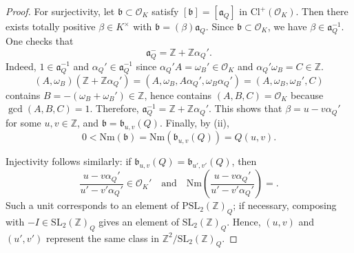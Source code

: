 \documentclass[10pt,a4paper]{amsart}
\begin{document}
\begin{proof}
For surjectivity, let $\mathfrak{b}\subset\mathcal{O}_{K}$ satisfy $[\mathfrak{b}]=[\mathfrak{a}_{Q}]$ in $\mathrm{Cl}^{+}(\mathcal{O}_{K})$.
Then there exists totally positive $\beta\in K^{\times}$ with $\mathfrak{b}=(\beta)\mathfrak{a}_{Q}$.
Since $\mathfrak{b}\subset\mathcal{O}_{K}$, we have $\beta\in\mathfrak{a}_{Q}^{-1}$.
One checks that
$$\mathfrak{a}_{Q}^{-}=\mathbb{Z}+\mathbb{Z}\alpha_{Q}'.$$
Indeed, $1\in\mathfrak{a}_{Q}^{-1}$ and $\alpha_{Q}'\in\mathfrak{a}_{Q}^{-1}$ since $\alpha_Q'A=\omega_{B}'\in\mathcal{O}_{K}$ and $\alpha_Q'\omega_B=C\in\mathbb{Z}$.
$$(A,\omega_{B})(\mathbb{Z}+\mathbb{Z}\alpha_{Q}')=(A,\omega_{B},A\alpha_{Q}',\omega_{B}\alpha_{Q}')=(A,\omega_{B},\omega_{B}',C)$$
contains $B=-(\omega_{B}+\omega_{B}')\in\mathbb{Z}$, hence contains $(A,B,C)=\mathcal{O}_{K}$ because $\gcd(A,B,C)=1$.
Therefore, $\mathfrak{a}_{Q}^{-1}=\mathbb{Z}+\mathbb{Z}\alpha_{Q}'$. This shows that $\beta=u-v\alpha_{Q}'$ for some $u,v\in\mathbb{Z}$, and $\mathfrak{b}=\mathfrak{b}_{u,v}(Q)$.
Finally, by (ii), 
$$0<\mathrm{Nm}(\mathfrak b)=\mathrm{Nm}(\mathfrak{b}_{u,v}(Q))=Q(u,v).$$

Injectivity follows similarly: if $\mathfrak b_{u,v}(Q)=\mathfrak b_{u',v'}(Q)$, then
$$\frac{u-v\alpha_{Q}'}{u'-v'\alpha_{Q}'}\in\mathcal{O}_{K}'\quad\text{and}\quad\mathrm{Nm}\left(\frac{u-v\alpha_{Q}'}{u'-v'\alpha_{Q}'}\right)=.$$
Such a unit corresponds to an element of $\mathrm{PSL}_{2}(\mathbb{Z})_{Q}$; if necessary, composing with $-I\in\mathrm{SL}_{2}(\mathbb{Z})_{Q}$ gives an element of $\mathrm{SL}_2(\mathbb{Z})_{Q}$.
Hence, $(u,v)$ and $(u',v')$ represent the same class in $\mathbb{Z}^{2}/\mathrm{SL}_{2}(\mathbb{Z})_{Q}$.
\end{proof}
\end{document}
